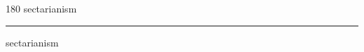 
\begin{frame}
\begin{center}
\begin{turn}{180}
{\fontsize{2.5cm}{1em}\selectfont sectarianism}
\end{turn}
\vspace{1em}\par  
\hrule
\vspace{1em}\par  
{\fontsize{2.5cm}{1em}\selectfont sectarianism}
\end{center}
\end{frame}
